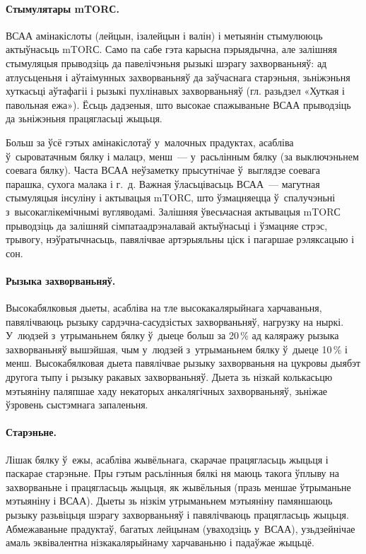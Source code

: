 
\paragraph{Стымулятары mTORС.}
ВСАА амінакіслоты (лейцын, ізалейцын і валін) і метыянін стымулююць актыўнасьць mTORС. Само па сабе гэта карысна пэрыядычна, але залішняя стымуляцыя прыводзіць да павелічэньня рызыкі шэрагу захворваньняў: ад атлусьценьня і аўтаімунных захворваньняў да заўчаснага старэньня, зьніжэньня хуткасьці аўтафагіі і рызыкі пухлінавых захворваньняў (гл. разьдзел «Хуткая і павольная ежа»). Ёсьць дадзеныя, што высокае спажываньне ВСАА прыводзіць да зьніжэньня працягласьці жыцьця.

Больш за ўсё гэтых амінакіслотаў у~малочных прадуктах, асабліва ў~сыроватачным бялку і малацэ, менш~--- у~расьлінным бялку (за выключэньнем соевага бялку). Часта ВСАА неўзаметку прысутнічае ў~выглядзе соевага парашка, сухога малака і г.~д. Важная ўласьцівасьць ВСАА~--- магутная стымуляцыя інсуліну і актывацыя mTORС, што ўзмацняецца ў~спалучэньні з~высокаглікемічнымі вугляводамі. Залішняя ўвесьчасная актывацыя mTORС прыводзіць да залішняй сімпатаадрэналавай актыўнасьці і ўзмацняе стрэс, трывогу, нэўратычнасьць, павялічвае артэрыяльны ціск і пагаршае рэляксацыю і сон.

\paragraph{Рызыка захворваньняў.}
Высокабялковыя дыеты, асабліва на тле высокакалярыйнага харчаваньня, павялічваюць рызыку сардэчна-сасудзістых захворваньняў, нагрузку на ныркі. У~людзей з~утрыманьнем бялку ў~дыеце больш за 20\,\% ад каляражу рызыка захворваньняў вышэйшая, чым у~людзей з~утрыманьнем бялку ў~дыеце 10\,\% і менш. Высокабялковая дыета павялічвае рызыку захворваньня на цукровы дыябэт другога тыпу і рызыку ракавых захворваньняў. Дыета зь нізкай колькасьцю мэтыяніну паляпшае хаду некаторых анкалягічных захворваньняў, зьніжае ўзровень сыстэмнага запаленьня.

\paragraph{Старэньне.}
Лішак бялку ў~ежы, асабліва жывёльнага, скарачае працягласьць жыцьця і паскарае старэньне. Пры гэтым расьлінныя бялкі ня маюць такога ўплыву на захворваньне і працягласьць жыцьця, як жывёльныя (празь меншае ўтрыманьне мэтыяніну і ВСАА). Дыеты зь нізкім утрыманьнем мэтыяніну памяншаюць рызыку разьвіцьця шэрагу захворваньняў і павялічваюць працягласьць жыцьця. Абмежаваньне прадуктаў, багатых лейцынам (уваходзіць у~ВСАА), узьдзейнічае амаль эквівалентна нізкакалярыйнаму харчаваньню і падаўжае жыцьцё.

